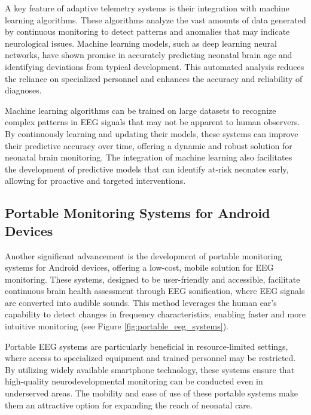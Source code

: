 \documentclass[12pt,journal,compsoc]{IEEEtran}
\begin{document}
A key feature of adaptive telemetry systems is their integration with machine learning algorithms. These algorithms analyze the vast amounts of data generated by continuous monitoring to detect patterns and anomalies that may indicate neurological issues. Machine learning models, such as deep learning neural networks, have shown promise in accurately predicting neonatal brain age and identifying deviations from typical development. This automated analysis reduces the reliance on specialized personnel and enhances the accuracy and reliability of diagnoses.

Machine learning algorithms can be trained on large datasets to recognize complex patterns in EEG signals that may not be apparent to human observers. By continuously learning and updating their models, these systems can improve their predictive accuracy over time, offering a dynamic and robust solution for neonatal brain monitoring. The integration of machine learning also facilitates the development of predictive models that can identify at-risk neonates early, allowing for proactive and targeted interventions.

\subsection{Portable Monitoring Systems for Android Devices}

Another significant advancement is the development of portable monitoring systems for Android devices, offering a low-cost, mobile solution for EEG monitoring. These systems, designed to be user-friendly and accessible, facilitate continuous brain health assessment through EEG sonification, where EEG signals are converted into audible sounds. This method leverages the human ear's capability to detect changes in frequency characteristics, enabling faster and more intuitive monitoring (see Figure \ref{fig:portable_eeg_systems}).

Portable EEG systems are particularly beneficial in resource-limited settings, where access to specialized equipment and trained personnel may be restricted. By utilizing widely available smartphone technology, these systems ensure that high-quality neurodevelopmental monitoring can be conducted even in underserved areas. The mobility and ease of use of these portable systems make them an attractive option for expanding the reach of neonatal care.
\end{document}

